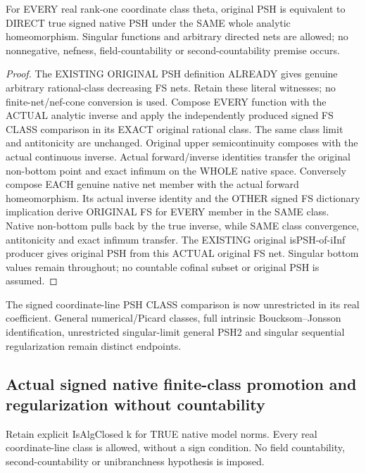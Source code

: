 \begin{theorem}
\label{thm:seven-native-original-signed-psh-class-comparison}
\leanok
For EVERY real rank-one coordinate class theta, original PSH is equivalent
to DIRECT true signed native PSH under the SAME whole analytic homeomorphism.
Singular functions and arbitrary directed nets are allowed; no nonnegative,
nefness, field-countability or second-countability premise occurs.
\end{theorem}
\begin{proof}
The EXISTING ORIGINAL PSH definition ALREADY gives genuine arbitrary
rational-class decreasing FS nets. Retain these literal witnesses;
no finite-net/nef-cone conversion is used. Compose EVERY function with
the ACTUAL analytic inverse and apply the independently produced signed
FS CLASS comparison in its EXACT original rational class. The same class
limit and antitonicity are unchanged. Original upper semicontinuity
composes with the actual continuous inverse. Actual forward/inverse
identities transfer the original non-bottom point and exact infimum
on the WHOLE native space. Conversely compose EACH genuine native net
member with the actual forward homeomorphism. Its actual inverse identity
and the OTHER signed FS dictionary implication derive ORIGINAL FS for
EVERY member in the SAME class. Native non-bottom pulls back by the true
inverse, while SAME class convergence, antitonicity and exact infimum
transfer. The EXISTING original isPSH-of-iInf producer gives original
PSH from this ACTUAL original FS net. Singular bottom values remain
throughout; no countable cofinal subset or original PSH is assumed.
\end{proof}

The signed coordinate-line PSH CLASS comparison is now unrestricted in
its real coefficient. General numerical/Picard classes, full intrinsic
Boucksom--Jonsson identification, unrestricted singular-limit general
PSH2 and singular sequential regularization remain distinct endpoints.

\subsection{Actual signed native finite-class promotion and regularization without countability}
Retain explicit IsAlgClosed k for TRUE native model norms. Every real
coordinate-line class is allowed, without a sign condition. No field
countability, second-countability or unibranchness hypothesis is imposed.

